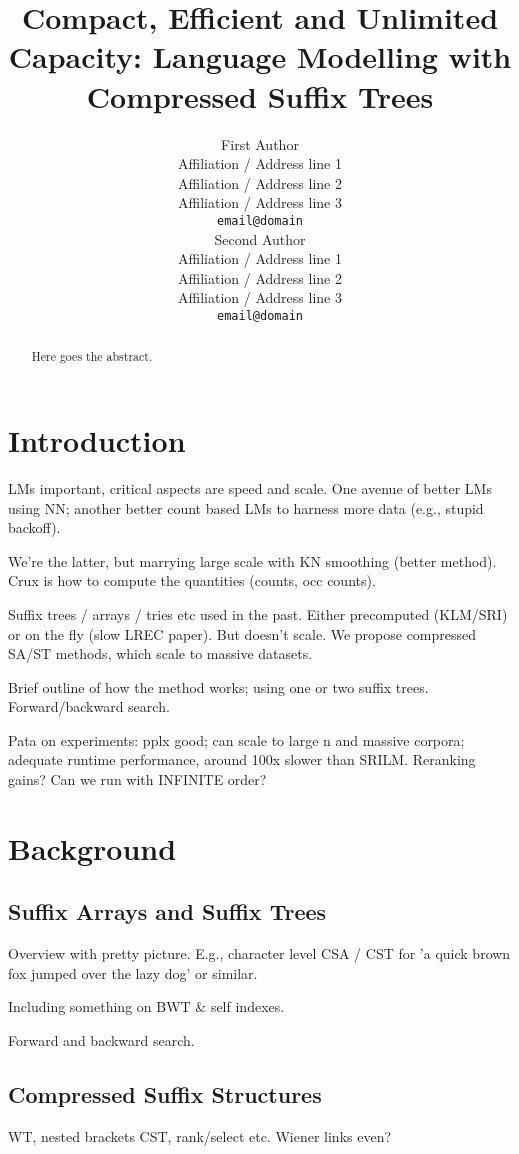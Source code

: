 \documentclass[11pt,a4paper]{article}
\title{Compact, Efficient and Unlimited Capacity:
    Language Modelling with Compressed Suffix Trees}
\author{First Author \\
  Affiliation / Address line 1 \\
  Affiliation / Address line 2 \\
  Affiliation / Address line 3 \\
  {\tt email@domain} \\\And
  Second Author \\
  Affiliation / Address line 1 \\
  Affiliation / Address line 2 \\
  Affiliation / Address line 3 \\
  {\tt email@domain} \\}
\date{}
\begin{document}
\maketitle
\begin{abstract}
  Here goes the abstract.
\end{abstract}

\section{Introduction}

LMs important, critical aspects are speed and scale. One avenue of better LMs using NN; another
better count based LMs to harness more data (e.g., stupid backoff). 

We're the latter, but marrying large scale with KN smoothing (better method). Crux is how to compute
the quantities (counts, occ counts). 

Suffix trees / arrays / tries etc used in the past. Either precomputed (KLM/SRI) or on the fly (slow
LREC paper). But doesn't scale. We propose compressed SA/ST methods, which scale to massive datasets.

Brief outline of how the method works; using one or two suffix trees. Forward/backward search.

Pata on experiments: pplx good; can scale to large n and massive corpora; adequate runtime
performance, around 100x slower than SRILM. Reranking gains? Can we run with INFINITE order?

\section{Background}

\subsection{Suffix Arrays and Suffix Trees}

Overview with pretty picture. E.g., character level CSA / CST for 
'a quick brown fox jumped over the lazy dog' or similar.

Including something on BWT \& self indexes.

Forward and backward search.

\subsection{Compressed Suffix Structures}

WT, nested brackets CST, rank/select etc. Wiener links even?
\end{document}
